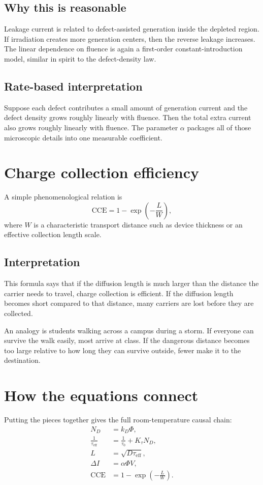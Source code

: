 \documentclass[11pt]{article}
\newcommand{\taueff}{\tau_\mathrm{eff}}
\begin{document}
\subsection{Why this is reasonable}
Leakage current is related to defect-assisted generation inside the depleted region. If irradiation creates more generation centers, then the reverse leakage increases. The linear dependence on fluence is again a first-order constant-introduction model, similar in spirit to the defect-density law.

\subsection{Rate-based interpretation}
Suppose each defect contributes a small amount of generation current and the defect density grows roughly linearly with fluence. Then the total extra current also grows roughly linearly with fluence. The parameter $\alpha$ packages all of those microscopic details into one measurable coefficient.

\section{Charge collection efficiency}
A simple phenomenological relation is
\begin{equation}
\mathrm{CCE} = 1 - \exp\!\left(-\frac{L}{W}\right),
\end{equation}
where $W$ is a characteristic transport distance such as device thickness or an effective collection length scale.

\subsection{Interpretation}
This formula says that if the diffusion length is much larger than the distance the carrier needs to travel, charge collection is efficient. If the diffusion length becomes short compared to that distance, many carriers are lost before they are collected.

An analogy is students walking across a campus during a storm. If everyone can survive the walk easily, most arrive at class. If the dangerous distance becomes too large relative to how long they can survive outside, fewer make it to the destination.

\section{How the equations connect}
Putting the pieces together gives the full room-temperature causal chain:
\begin{align}
N_D &= k_D \Phi, \\
\frac{1}{\taueff} &= \frac{1}{\tau_0} + K_\tau N_D, \\
L &= \sqrt{D\taueff}, \\
\Delta I &= \alpha \Phi V, \\
\mathrm{CCE} &= 1 - \exp\!\left(-\frac{L}{W}\right).
\end{align}
\end{document}
